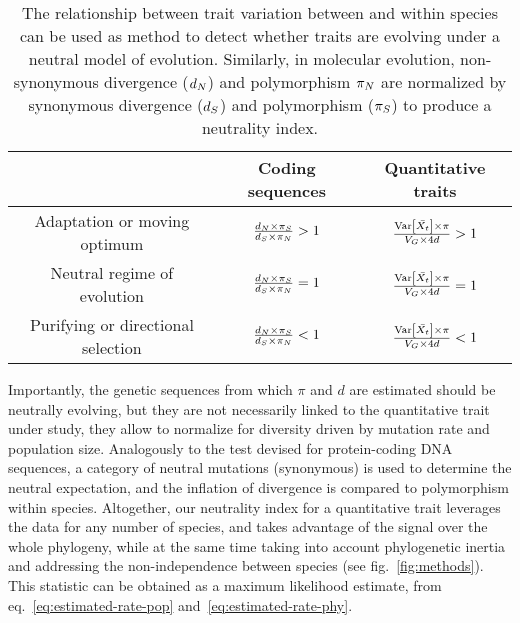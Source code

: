 \documentclass{article}
\begin{document}
\begin{table*}[tb]
    \centering
    \begin{adjustbox}{width = 0.75\textwidth}
        \begin{tabular}{|c||c|c|}
            \hline
            & Coding sequences                                  & Quantitative traits                                               \\ \hline \hline
            Adaptation or moving optimum       & $\frac{d_N \times \pi_S}{d_S \times \pi_N} > 1$ & $ \frac{\operatorname{\text{Var}} \left[\bar{X_{t}}\right] \times \pi}{ V_{G} \times 4 d } > 1 $ \\ \hline
            Neutral regime of evolution        & $\frac{d_N \times \pi_S}{d_S \times \pi_N} = 1$ & $ \frac{\operatorname{\text{Var}} \left[\bar{X_{t}}\right] \times \pi}{ V_{G} \times 4 d } = 1 $ \\ \hline
            Purifying or directional selection & $\frac{d_N \times \pi_S}{d_S \times \pi_N} < 1$ & $\frac{\operatorname{\text{Var}} \left[\bar{X_{t}}\right] \times \pi}{ V_{G} \times 4 d } < 1 $ \\ \hline
        \end{tabular}
    \end{adjustbox}
    \caption{
        The relationship between trait variation between and within species can be used as method to detect whether traits are evolving under a neutral model of evolution.
        Similarly, in molecular evolution, non-synonymous divergence ($d_N$) and polymorphism $\pi_N$ are normalized by synonymous divergence ($d_S$) and polymorphism ($\pi_S$) to produce a neutrality index\cite{mcdonald_adaptative_1991, fay_evaluating_2008}.
    }
    \label{table:unfolded-MK}
\end{table*}

Importantly, the genetic sequences from which $\pi$ and $d$ are estimated should be neutrally evolving, but they are not necessarily linked to the quantitative trait under study, they allow to normalize for diversity driven by mutation rate and population size.
Analogously to the \textcite{mcdonald_adaptative_1991} test devised for protein-coding DNA sequences, a category of neutral mutations (synonymous) is used to determine the neutral expectation, and the inflation of divergence is compared to polymorphism within species.
Altogether, our neutrality index for a quantitative trait leverages the data for any number of species, and takes advantage of the signal over the whole phylogeny, while at the same time taking into account phylogenetic inertia and addressing the non-independence between species (see fig.~\ref{fig:methods}).
This statistic can be obtained as a maximum likelihood estimate, from eq.~\ref{eq:estimated-rate-pop} and~\ref{eq:estimated-rate-phy}.
\end{document}
